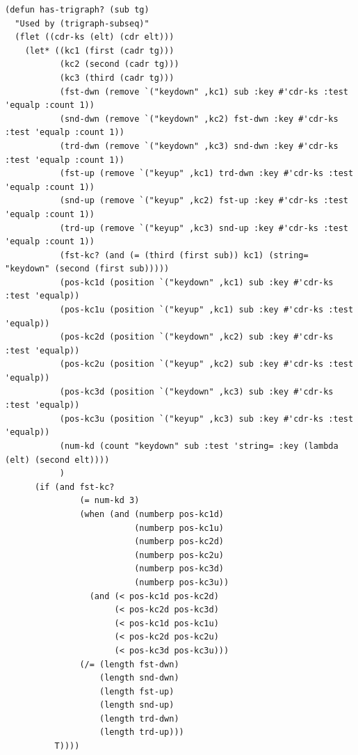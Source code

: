 \begin{lstlisting}[frame=single]
 (defun has-trigraph? (sub tg)
  "Used by (trigraph-subseq)"
  (flet ((cdr-ks (elt) (cdr elt)))
    (let* ((kc1 (first (cadr tg)))
           (kc2 (second (cadr tg)))
           (kc3 (third (cadr tg)))
           (fst-dwn (remove `("keydown" ,kc1) sub :key #'cdr-ks :test 'equalp :count 1))
           (snd-dwn (remove `("keydown" ,kc2) fst-dwn :key #'cdr-ks :test 'equalp :count 1))
           (trd-dwn (remove `("keydown" ,kc3) snd-dwn :key #'cdr-ks :test 'equalp :count 1))
           (fst-up (remove `("keyup" ,kc1) trd-dwn :key #'cdr-ks :test 'equalp :count 1))
           (snd-up (remove `("keyup" ,kc2) fst-up :key #'cdr-ks :test 'equalp :count 1))
           (trd-up (remove `("keyup" ,kc3) snd-up :key #'cdr-ks :test 'equalp :count 1))
           (fst-kc? (and (= (third (first sub)) kc1) (string= "keydown" (second (first sub)))))
           (pos-kc1d (position `("keydown" ,kc1) sub :key #'cdr-ks :test 'equalp))
           (pos-kc1u (position `("keyup" ,kc1) sub :key #'cdr-ks :test 'equalp))
           (pos-kc2d (position `("keydown" ,kc2) sub :key #'cdr-ks :test 'equalp))
           (pos-kc2u (position `("keyup" ,kc2) sub :key #'cdr-ks :test 'equalp))
           (pos-kc3d (position `("keydown" ,kc3) sub :key #'cdr-ks :test 'equalp))
           (pos-kc3u (position `("keyup" ,kc3) sub :key #'cdr-ks :test 'equalp))
           (num-kd (count "keydown" sub :test 'string= :key (lambda (elt) (second elt))))
           )
      (if (and fst-kc?
               (= num-kd 3)
               (when (and (numberp pos-kc1d)
                          (numberp pos-kc1u)
                          (numberp pos-kc2d)
                          (numberp pos-kc2u)
                          (numberp pos-kc3d)
                          (numberp pos-kc3u))
                 (and (< pos-kc1d pos-kc2d)
                      (< pos-kc2d pos-kc3d)
                      (< pos-kc1d pos-kc1u)
                      (< pos-kc2d pos-kc2u)
                      (< pos-kc3d pos-kc3u)))
               (/= (length fst-dwn)
                   (length snd-dwn)
                   (length fst-up)
                   (length snd-up)
                   (length trd-dwn)
                   (length trd-up)))
          T))))
\end{lstlisting}



